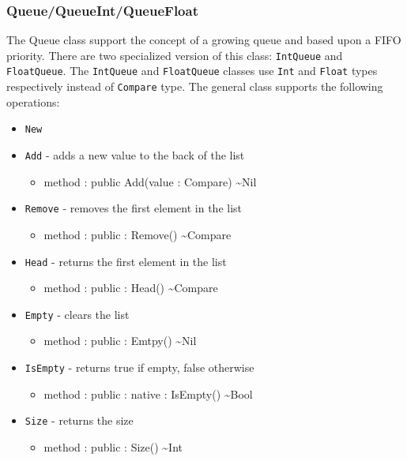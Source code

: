 \documentclass[11pt]{article}
\begin{document}
\subsubsection{Queue/QueueInt/QueueFloat}
The Queue class support the concept of a growing queue and based upon
a FIFO priority.  There are two specialized version of this class:
\texttt{IntQueue} and \texttt{FloatQueue}.  The \texttt{IntQueue} and
\texttt{FloatQueue} classes use \texttt{Int} and \texttt{Float} types
respectively instead of \texttt{Compare} type.  The general class
supports the following operations:
\begin{itemize}
\item \texttt{New}
\item \texttt{Add} - adds a new value to the back of the list
  \begin{itemize}
  \item method : public Add(value : Compare) \textasciitilde Nil
  \end{itemize}
\item \texttt{Remove} - removes the first element in the list
  \begin{itemize}
  \item method : public : Remove() \textasciitilde Compare
  \end{itemize}
\item \texttt{Head} - returns the first element in the list
  \begin{itemize}
  \item method : public : Head() \textasciitilde Compare
  \end{itemize}
\item \texttt{Empty} - clears the list
  \begin{itemize}
  \item method : public : Emtpy() \textasciitilde Nil
  \end{itemize}
\item \texttt{IsEmpty} - returns true if empty, false otherwise
  \begin{itemize}
  \item method : public : native : IsEmpty() \textasciitilde Bool
  \end{itemize}
\item \texttt{Size} - returns the size
  \begin{itemize}
  \item method : public : Size() \textasciitilde Int
  \end{itemize}
\end{itemize}
\end{document}
